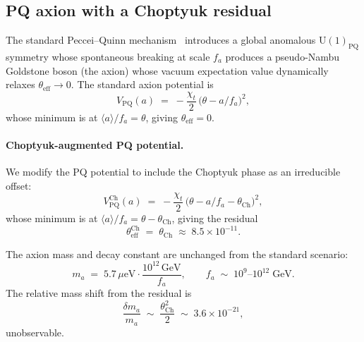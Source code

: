 \subsection{PQ axion with a Choptyuk residual}
\label{ssec:pq-residual}

The standard Peccei--Quinn mechanism~\cite{pecceiquinn1977}
introduces a global anomalous $\mathrm{U}(1)_{\mathrm{PQ}}$ symmetry
whose spontaneous breaking at scale $f_a$ produces a pseudo-Nambu
Goldstone boson (the axion) whose vacuum expectation value dynamically
relaxes $\theta_{\mathrm{eff}}\to 0$.  The standard axion potential is
\begin{equation}\label{eq:standard-PQ-potential}
  V_{\mathrm{PQ}}(a)\;=\;-\frac{\chi_t}{2}\,\bigl(\theta - a/f_a\bigr)^2,
\end{equation}
whose minimum is at $\langle a\rangle/f_a = \theta$, giving
$\theta_{\mathrm{eff}}=0$.

\paragraph{Choptyuk-augmented PQ potential.}
We modify the PQ potential to include the Choptyuk phase as an
irreducible offset:
\begin{equation}\label{eq:choptyuk-PQ-potential}
  V_{\mathrm{PQ}}^{\mathrm{Ch}}(a)
  \;=\;-\frac{\chi_t}{2}\,\bigl(\theta - a/f_a - \theta_{\mathrm{Ch}}\bigr)^2,
\end{equation}
whose minimum is at $\langle a\rangle/f_a = \theta - \theta_{\mathrm{Ch}}$,
giving the residual
\begin{equation}\label{eq:choptyuk-residual}
  \theta_{\mathrm{eff}}^{\mathrm{Ch}}\;=\;\theta_{\mathrm{Ch}}\;\approx\;8.5\times 10^{-11}.
\end{equation}

The axion mass and decay constant are unchanged from the standard
scenario:
\begin{equation}
  m_a\;=\;5.7\,\mu\mathrm{eV}\cdot\frac{10^{12}\,\mathrm{GeV}}{f_a},
  \qquad
  f_a\;\sim\;10^{9}\text{--}10^{12}\;\mathrm{GeV}.
\end{equation}
The relative mass shift from the residual is
\begin{equation}
  \frac{\delta m_a}{m_a}\;\sim\;\frac{\theta_{\mathrm{Ch}}^2}{2}
  \;\sim\;3.6\times 10^{-21},
\end{equation}
unobservable.

